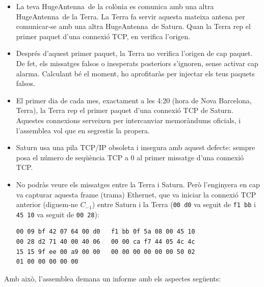 \begin{itemize}[itemsep=0.1cm]
\item La teva HugeAntenna\texttrademark\ de la colònia es comunica amb una altra HugeAntenna\texttrademark\ de la Terra. La Terra fa servir aquesta mateixa antena per comunicar-se amb una altra HugeAntenna\texttrademark\ de Saturn.
Quan la Terra rep el primer paquet d'una connexió TCP, en verifica l'origen.

\item Després d'aquest primer paquet, la Terra no verifica l'origen de cap paquet. De fet, els missatges falsos o inesperats posteriors s'ignoren, sense activar cap alarma. Calculant bé el moment, ho aprofitaràs per injectar els teus paquets falsos.

\item El primer dia de cada mes, exactament a les 4:20 (hora de Nova Barcelona, Terra), la Terra rep el primer paquet d'una connexió TCP de Saturn. Aquestes connexions serveixen per intercanviar memoràndums oficials, i l'assemblea vol que en segrestis la propera.

\item Saturn usa una pila TCP/IP obsoleta i insegura amb aquest defecte: sempre posa el número de seqüència TCP a $0$ al primer missatge d'una connexió TCP.

\item No podràs veure els missatges entre la Terra i Saturn. Però l'enginyera en cap va capturar aquesta frame (trama) Ethernet, que va iniciar la connexió TCP anterior (diguem-ne $C_{-1}$) entre Saturn i la Terra (\texttt{00 d0} va seguit de \texttt{f1 bb} i \texttt{45 10} va seguit de \texttt{00 28}):

\vspace{0.25cm}
\begin{center}
\begin{minipage}{0.5\linewidth}
\begin{verbatim}
00 09 bf 42 07 64 00 d0   f1 bb 0f 5a 08 00 45 10
00 28 d2 71 40 00 40 06   00 00 ca f7 44 05 4c 4c
15 15 9f ee 00 a9 00 00   00 00 00 00 00 00 50 02
01 00 00 00 00 00
\end{verbatim}
\end{minipage}
\end{center}
\vspace{0.25cm}
\end{itemize}

\noindent
Amb això, l'assemblea demana un informe amb els aspectes següents:

